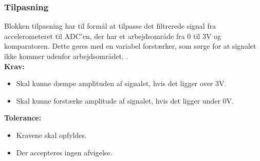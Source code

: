 \subsubsection{Tilpasning} 
Blokken tilpasning har til formål at tilpasse det filtrerede signal fra accelerometeret til ADC'en, der har et arbejdsområde fra 0 til 3V og komparatoren. Dette gøres med en variabel forstærker, som sørge for at signalet ikke kommer udenfor arbejdsområdet. . \\
\textbf{Krav:}
\begin{itemize}
\item Skal kunne dæmpe amplituden af signalet, hvis det ligger over 3V.
\item Skal kunne forstærke amplitude af signalet, hvis det ligger under 0V.
\end{itemize}
\textbf{Tolerance:}
\begin{itemize}
\item Kravene skal opfyldes.
\item Der accepteres ingen afvigelse.
\end{itemize}
